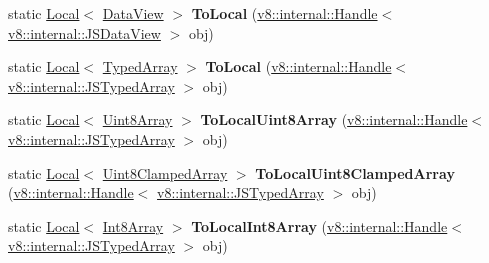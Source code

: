 \begin{DoxyCompactItemize}
\item 
static \hyperlink{classv8_1_1_local}{Local}$<$ \hyperlink{classv8_1_1_data_view}{Data\+View} $>$ {\bfseries To\+Local} (\hyperlink{classv8_1_1internal_1_1_handle}{v8\+::internal\+::\+Handle}$<$ \hyperlink{classv8_1_1internal_1_1_j_s_data_view}{v8\+::internal\+::\+J\+S\+Data\+View} $>$ obj)\hypertarget{classv8_1_1_utils_a5a80d6ff948e3e66ae0338b27285d943}{}\label{classv8_1_1_utils_a5a80d6ff948e3e66ae0338b27285d943}

\item 
static \hyperlink{classv8_1_1_local}{Local}$<$ \hyperlink{classv8_1_1_typed_array}{Typed\+Array} $>$ {\bfseries To\+Local} (\hyperlink{classv8_1_1internal_1_1_handle}{v8\+::internal\+::\+Handle}$<$ \hyperlink{classv8_1_1internal_1_1_j_s_typed_array}{v8\+::internal\+::\+J\+S\+Typed\+Array} $>$ obj)\hypertarget{classv8_1_1_utils_a501a607d456e364d40083fc8a8874c78}{}\label{classv8_1_1_utils_a501a607d456e364d40083fc8a8874c78}

\item 
static \hyperlink{classv8_1_1_local}{Local}$<$ \hyperlink{classv8_1_1_uint8_array}{Uint8\+Array} $>$ {\bfseries To\+Local\+Uint8\+Array} (\hyperlink{classv8_1_1internal_1_1_handle}{v8\+::internal\+::\+Handle}$<$ \hyperlink{classv8_1_1internal_1_1_j_s_typed_array}{v8\+::internal\+::\+J\+S\+Typed\+Array} $>$ obj)\hypertarget{classv8_1_1_utils_ae22804d5beaa2c8fe0761d137963f553}{}\label{classv8_1_1_utils_ae22804d5beaa2c8fe0761d137963f553}

\item 
static \hyperlink{classv8_1_1_local}{Local}$<$ \hyperlink{classv8_1_1_uint8_clamped_array}{Uint8\+Clamped\+Array} $>$ {\bfseries To\+Local\+Uint8\+Clamped\+Array} (\hyperlink{classv8_1_1internal_1_1_handle}{v8\+::internal\+::\+Handle}$<$ \hyperlink{classv8_1_1internal_1_1_j_s_typed_array}{v8\+::internal\+::\+J\+S\+Typed\+Array} $>$ obj)\hypertarget{classv8_1_1_utils_a5e7913057929857dea7a19f79f3ab36f}{}\label{classv8_1_1_utils_a5e7913057929857dea7a19f79f3ab36f}

\item 
static \hyperlink{classv8_1_1_local}{Local}$<$ \hyperlink{classv8_1_1_int8_array}{Int8\+Array} $>$ {\bfseries To\+Local\+Int8\+Array} (\hyperlink{classv8_1_1internal_1_1_handle}{v8\+::internal\+::\+Handle}$<$ \hyperlink{classv8_1_1internal_1_1_j_s_typed_array}{v8\+::internal\+::\+J\+S\+Typed\+Array} $>$ obj)\hypertarget{classv8_1_1_utils_abfaa1700e2a92b3c9c176b730f96aa4c}{}\label{classv8_1_1_utils_abfaa1700e2a92b3c9c176b730f96aa4c}


\end{DoxyCompactItemize}
